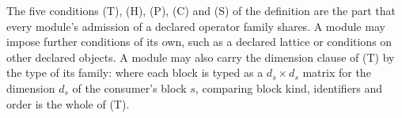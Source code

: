 
The five conditions (T), (H), (P), (C) and (S) of the definition are the
part that every module's admission of a declared operator family shares. A
module may impose further conditions of its own, such as a declared lattice
or conditions on other declared objects. A
module may also carry the dimension clause of (T) by the type of its family:
where each block is typed as a $d_s\times d_s$ matrix for the dimension $d_s$
of the consumer's block $s$, comparing block kind, identifiers and order is the
whole of (T).


